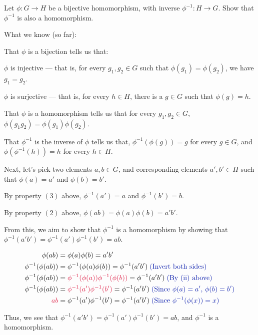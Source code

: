 \begin{problem}
  Let $\phi \colon G \to H$ be a bijective homomorphism, with inverse $\phi^{-1}
  \colon H \to G$.  Show that $\phi^{-1}$ is also a homomorphism.
\end{problem}
\begin{Answer}
  What we know (so far):
  \begin{enumroman}
    \item That $\phi$ is a bijection tells us that:
    \begin{enumalph}
      \item $\phi$ is injective --- that is, for every $g_1,g_2 \in G$ such that 
        $\phi(g_1) = \phi(g_2)$, we have $g_1 = g_2$.
      \item $\phi$ is surjective --- that is, for every $h \in H$, there is a $g \in G$
        such that $\phi(g) = h$.
    \end{enumalph}

    \item That $\phi$ is a homomorphism tells us that for every $g_1, g_2 \in G$,
    $\phi(g_1g_2) = \phi(g_1)\phi(g_2)$.
    \item That $\phi^{-1}$ is the inverse of $\phi$ tells us that,
    $\phi^{-1}(\phi(g)) = g$ for every $g \in G$,
    and $\phi(\phi^{-1}(h)) = h$ for every $h \in H$.
  \end{enumroman}

  \noindent
  Next, let's pick two elements $a,b \in G$, and corresponding elements $a',b' \in H$
  such that $\phi(a) = a'$ and $\phi(b) = b'$.

  \noindent
  By property $(3)$ above, $\phi^{-1}(a') = a$
  and $\phi^{-1}(b') = b$.

  \noindent
  By property $(2)$ above, $\phi(ab) = \phi(a)\phi(b) = a'b'$.

  \noindent
  From this, we aim to show that $\phi^{-1}$ is a homomorphism
  by showing that $\phi^{-1}(a'b') = \phi^{-1}(a')\phi^{-1}(b') = ab$.

  \begin{align*}
    \phi(ab) &= \phi(a)\phi(b) = a'b' \\
    \phi^{-1}(\phi(ab)) &= \phi^{-1}(\phi(a)\phi(b)) = \phi^{-1}(a'b')\; \zaff{\text{(Invert both sides)}} \\
    \phi^{-1}(\phi(ab)) &= \crim{\phi^{-1}(\phi(a))\phi^{-1}(\phi(b))} = \phi^{-1}(a'b')\; \zaff{\text{(By (ii) above)}} \\
    \phi^{-1}(\phi(ab)) &= \crim{\phi^{-1}(a')\phi^{-1}(b')} = \phi^{-1}(a'b')\; \zaff{\text{(Since $\phi(a) = a'$, $\phi(b) = b'$)}} \\
    \crim{ab} &= \phi^{-1}(a')\phi^{-1}(b') = \phi^{-1}(a'b')\; \zaff{\text{(Since $\phi^{-1}(\phi(x)) = x$)}} \\
  \end{align*}

  \noindent
  Thus, we see that $\phi^{-1}(a'b') = \phi^{-1}(a')\phi^{-1}(b') = ab$,
  and $\phi^{-1}$ is a homomorphism.
\end{Answer}
